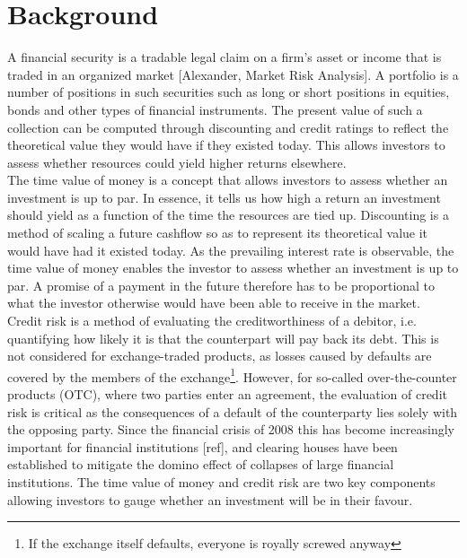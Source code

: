 \chapter{Background}

A financial security is a tradable legal claim on a firm's asset or income that
is traded in an organized market [Alexander, Market Risk Analysis]. A portfolio
is a number of positions in such securities such as long or short positions in equities, bonds and other types of financial instruments. The present value of such a collection can be computed through discounting and credit ratings to reflect the theoretical value they would have if they existed today. This allows investors to assess whether resources could yield higher returns elsewhere.\\

The time value of money is a concept that allows investors to assess whether an investment is up to par. In essence, it tells us how high a return an investment should yield as a function of the time the resources are tied up.
Discounting is a method of scaling a future cashflow so as to represent its theoretical value it would have had it existed today.
As the prevailing interest rate is observable, the time value of money enables the investor to assess whether an investment is up to par. A promise of a payment in the future therefore has to be proportional to what the investor otherwise would have been able to receive in the market.\\

Credit risk is a method of evaluating the creditworthiness of a debitor, i.e. quantifying how likely it is that the counterpart will pay back its debt. This is not considered for exchange-traded products, as losses caused by defaults are covered by the members of the exchange\footnote{If the exchange itself defaults, everyone is royally screwed anyway}. However, for so-called over-the-counter products (OTC), where two parties enter an agreement, the evaluation of credit risk is critical as the consequences of a default of the counterparty lies solely with the opposing party. Since the financial crisis of 2008 this has become increasingly important for financial institutions [ref], and clearing houses have been established to mitigate the domino effect of collapses of large financial institutions.
The time value of money and credit risk are two key components allowing investors to gauge whether an investment will be in their favour.\\

